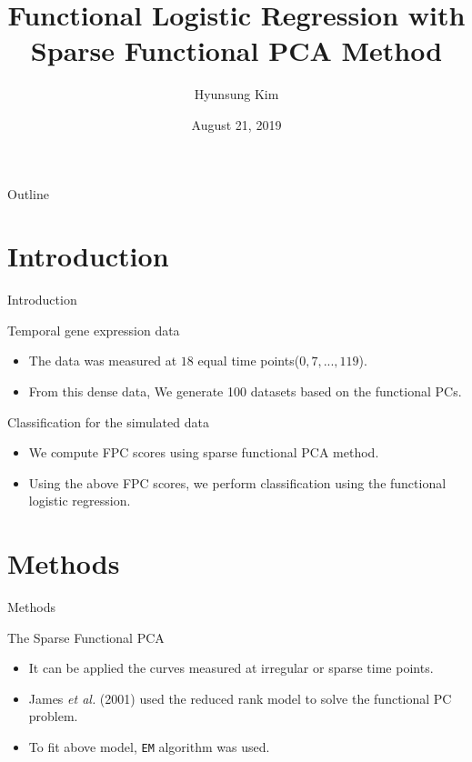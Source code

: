 \documentclass{beamer}
\title{Functional Logistic Regression with Sparse Functional PCA Method}
\date[Short Occasion]{August 21, 2019}
\author{Hyunsung Kim}
\institute{Department of Statistics\\ Chung-Ang University}
\subtitle{}
\begin{document}
\begin{frame}
  \titlepage
\end{frame}

\begin{frame}{Outline}
  \tableofcontents
\end{frame}

\section{Introduction}
\begin{frame}{Introduction}
	\begin{block}{Temporal gene expression data}
		\vspace{0.1cm}
		\begin{itemize}
			\item {
				The data was measured at $18$ equal time points($0, 7, ..., 119$).
			}
			\item {
				From this dense data, We generate 100 datasets based on the functional PCs. 
			}
		\end{itemize}
	\end{block}
	\begin{block}{Classification for the simulated data}
		\vspace{0.1cm}
		\begin{itemize}
			\item {
				We compute FPC scores using sparse functional PCA method.
			}
			\item {
				Using the above FPC scores, we perform classification using the functional logistic regression.
			}
		\end{itemize}
	\end{block}
\end{frame}


\section{Methods}
\begin{frame}{Methods}
	\begin{block}{The Sparse Functional PCA}
		\vspace{0.1cm}
		\begin{itemize}
			\item {
				It can be applied the curves measured at irregular or sparse time points.
			}
			\item {
				 James \textit{et al.} (2001) used the reduced rank model to solve the functional PC problem.
			}
			\item {
				To fit above model, \texttt{EM} algorithm was used.
			}
		\end{itemize}
	\end{block}
\end{frame}
\end{document}
